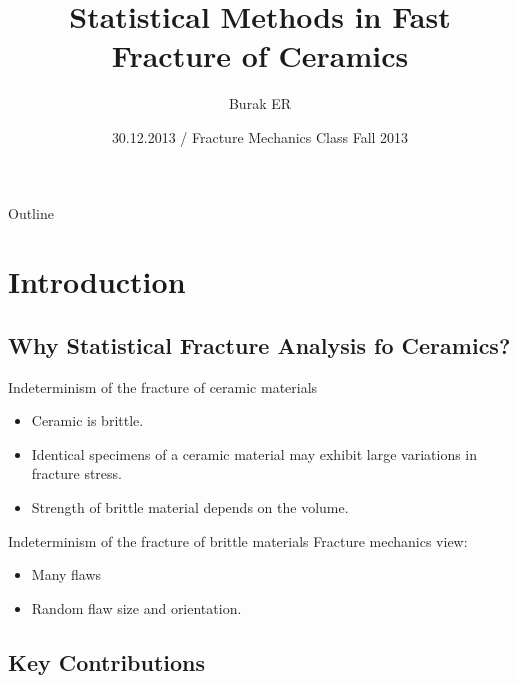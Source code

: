 \documentclass{beamer}
\title[Statistical Methods in Fast Fracture of Ceramics] %
{Statistical Methods in Fast Fracture of Ceramics}
\author[Burak ER] %
{Burak ER\inst{1}}
\institute[Universities of Somewhere and Elsewhere] %
{
  \inst{1}%
  Department of Mechanical Engineering\\
  Bursa Technical University
}
\date[Short Occasion] %
{30.12.2013 / Fracture Mechanics Class Fall 2013}
\begin{document}
\begin{frame}
  \titlepage
\end{frame}

\begin{frame}{Outline}
  \tableofcontents
\end{frame}




\section{Introduction}
\subsection[Why Statistical Fracture Analysis fo Ceramics?]{Why Statistical Fracture Analysis fo Ceramics?}
\begin{frame}{Indeterminism of the fracture of ceramic materials}{}
\begin{itemize}
\item {Ceramic is brittle.}
\item {Identical specimens of a ceramic material may exhibit large variations in
fracture stress.}
\item {Strength of brittle material depends on the volume.}
\end{itemize} 
\end{frame}

\begin{frame}{Indeterminism of the fracture of brittle materials}{}
Fracture mechanics view:
\begin{itemize}
\item {Many flaws}
\item {Random flaw size and orientation.}
\end{itemize} 
\end{frame}
\subsection[Key Contributions]{Key Contributions}
\end{document}
